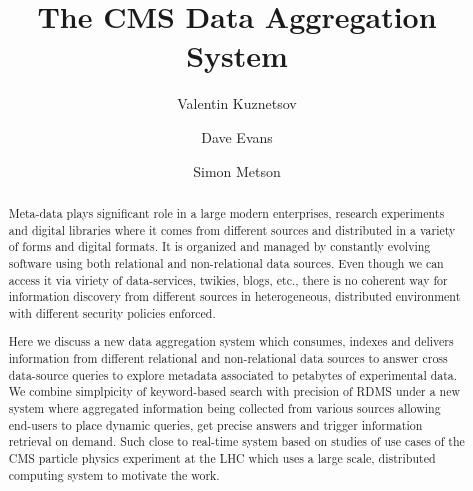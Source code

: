 \documentclass[a4paper]{jpconf}
\begin{document}
\title{The CMS Data Aggregation System}

\author{Valentin Kuznetsov}
\address{Cornell University, Ithaca, New York, USA}

\author{Dave Evans}
\address{Fermilab, Batavia, Illinois, USA}

\author{Simon Metson}
\address{Bristol University, Bristol, UK}



\begin{abstract}

Meta-data plays signiﬁcant role in a large modern enterprises, 
research experiments and digital libraries where it comes from different 
sources and distributed in a variety of forms and digital formats. 
It is organized and managed by constantly evolving software using 
both relational and non-relational data sources. 
Even though we can access it via viriety of data-services, twikies, blogs, etc.,
there is no coherent way for information discovery from different sources
in heterogeneous, distributed environment with different security policies enforced.

Here we discuss a new data aggregation system which consumes, 
indexes and delivers information from different relational and 
non-relational data sources to answer cross data-source queries 
to explore metadata associated to petabytes of experimental data. 
We combine simplpicity of keyword-based search with precision of RDMS
under a new system where aggregated information being collected from various sources 
allowing end-users to place dynamic queries, get precise answers and 
trigger information retrieval on demand. Such close to real-time system 
based on studies  of use cases of the CMS particle physics experiment at 
the LHC which uses a large scale, distributed computing system to motivate the work.

\end{abstract}
\end{document}

